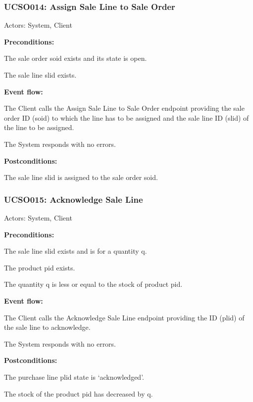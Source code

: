 \begin{ucbox}{\subsubsection{UCSO014: Assign Sale Line to Sale Order}}
\label{UCSO014}

Actors: System, Client

\textbf{Preconditions:}

\ucitem The sale order soid exists and its state is open.

\ucitem The sale line slid exists.

\textbf{Event flow:}

\ucitem The Client calls the Assign Sale Line to Sale Order endpoint providing the sale order ID (soid) to which the line has to be assigned and the sale line ID (slid) of the 
line to be assigned.

\ucitem The System responds with no errors.

\textbf{Postconditions:}

\ucitem The sale line slid is assigned to the sale order soid.

\end{ucbox}

\begin{ucbox}{\subsubsection{UCSO015: Acknowledge Sale Line}}
\label{UCSO015}

Actors: System, Client

\textbf{Preconditions:}

\ucitem The sale line slid exists and is for a quantity q.

\ucitem The product pid exists.

\ucitem The quantity q is less or equal to the stock of product pid.

\textbf{Event flow:}

\ucitem The Client calls the Acknowledge Sale Line endpoint providing the ID (plid) of the sale line to acknowledge.

\ucitem The System responds with no errors.

\textbf{Postconditions:}

\ucitem The purchase line plid state is ‘acknowledged’.

\ucitem The stock of the product pid has decreased by q.

\end{ucbox}

